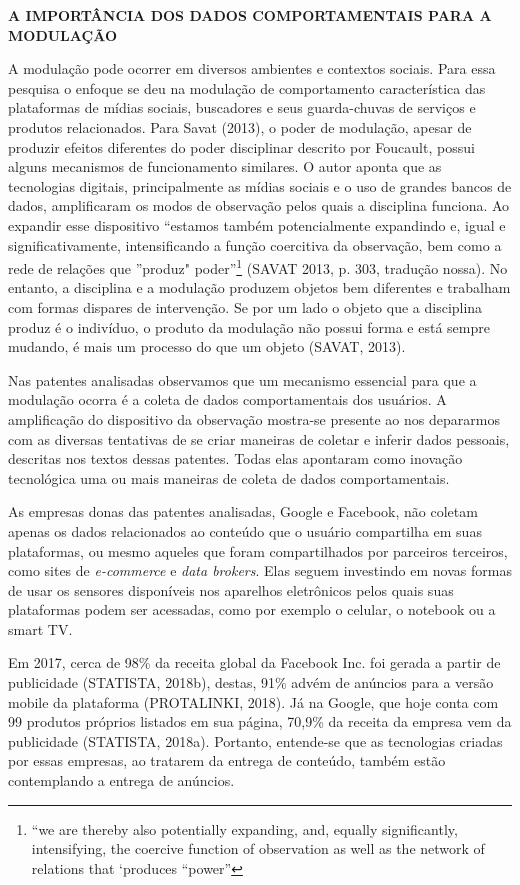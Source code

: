 \textbf{A IMPORTÂNCIA DOS DADOS COMPORTAMENTAIS PARA A MODULAÇÃO}

A modulação pode ocorrer em diversos ambientes e contextos sociais. Para
essa pesquisa o enfoque se deu na modulação de comportamento
característica das plataformas de mídias sociais, buscadores e seus
guarda-chuvas de serviços e produtos relacionados. Para Savat (2013), o
poder de modulação, apesar de produzir efeitos diferentes do poder
disciplinar descrito por Foucault, possui alguns mecanismos de
funcionamento similares. O autor aponta que as tecnologias digitais,
principalmente as mídias sociais e o uso de grandes bancos de dados,
amplificaram os modos de observação pelos quais a disciplina funciona.
Ao expandir esse dispositivo ``estamos também potencialmente expandindo
e, igual e significativamente, intensificando a função coercitiva da
observação, bem como a rede de relações que ''produz" poder''\footnote{``we
  are thereby also potentially expanding, and, equally significantly,
  intensifying, the coercive function of observation as well as the
  network of relations that `produces ``power''} (SAVAT 2013, p. 303,
tradução nossa). No entanto, a disciplina e a modulação produzem objetos
bem diferentes e trabalham com formas dispares de intervenção. Se por um
lado o objeto que a disciplina produz é o indivíduo, o produto da
modulação não possui forma e está sempre mudando, é mais um processo do
que um objeto (SAVAT, 2013).

Nas patentes analisadas observamos que um mecanismo essencial para que a
modulação ocorra é a coleta de dados comportamentais dos usuários. A
amplificação do dispositivo da observação mostra-se presente ao nos
depararmos com as diversas tentativas de se criar maneiras de coletar e
inferir dados pessoais, descritas nos textos dessas patentes. Todas elas
apontaram como inovação tecnológica uma ou mais maneiras de coleta de
dados comportamentais.

As empresas donas das patentes analisadas, Google e Facebook, não
coletam apenas os dados relacionados ao conteúdo que o usuário
compartilha em suas plataformas, ou mesmo aqueles que foram
compartilhados por parceiros terceiros, como sites de \emph{e-commerce}
e \emph{data brokers}. Elas seguem investindo em novas formas de usar os
sensores disponíveis nos aparelhos eletrônicos pelos quais suas
plataformas podem ser acessadas, como por exemplo o celular, o notebook
ou a smart TV.

Em 2017, cerca de 98\% da receita global da Facebook Inc. foi gerada a
partir de publicidade (STATISTA, 2018b), destas, 91\% advém de anúncios
para a versão mobile da plataforma (PROTALINKI, 2018). Já na Google, que
hoje conta com 99 produtos próprios listados em sua página, 70,9\% da
receita da empresa vem da publicidade (STATISTA, 2018a). Portanto,
entende-se que as tecnologias criadas por essas empresas, ao tratarem da
entrega de conteúdo, também estão contemplando a entrega de anúncios.

